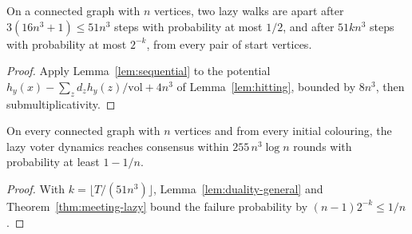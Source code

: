 \begin{theorem}\label{thm:meeting-lazy}
\leanok{}
On a connected graph with $n$ vertices, two lazy walks are apart after
$3(16n^3+1)\le 51n^3$ steps with probability at most $1/2$, and after $51kn^3$ steps with
probability at most $2^{-k}$, from every pair of start vertices.
\end{theorem}
\begin{proof}\leanok
Apply Lemma~\ref{lem:sequential} to the potential $h_y(x)-\sum_z d_z h_y(z)/\mathrm{vol}+4n^3$
of Lemma~\ref{lem:hitting}, bounded by $8n^3$, then submultiplicativity.
\end{proof}
\begin{theorem}\label{thm:hp25}
\leanok{}
On every connected graph with $n$ vertices and from every initial colouring, the lazy voter
dynamics reaches consensus within $255\,n^3\log n$ rounds with probability at least $1-1/n$.
\end{theorem}
\begin{proof}\leanok
With $k=\lfloor T/(51n^3)\rfloor$, Lemma~\ref{lem:duality-general} and
Theorem~\ref{thm:meeting-lazy} bound the failure probability by $(n-1)2^{-k}\le 1/n$.
\end{proof}

